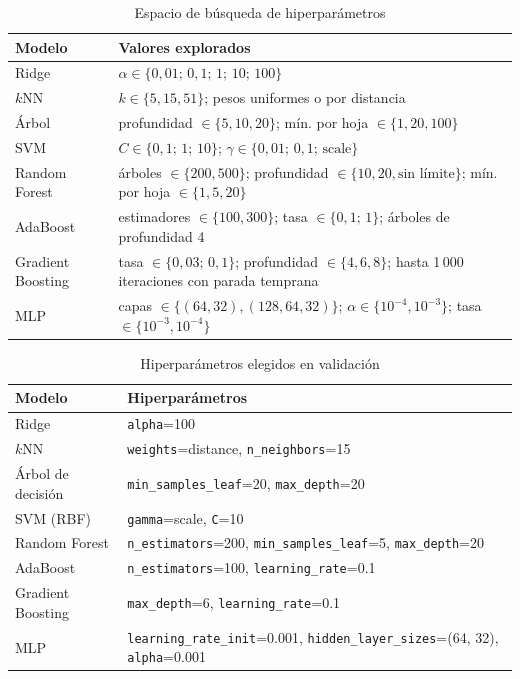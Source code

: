 \documentclass[conference,a4paper]{IEEEtran}
\begin{document}
\begin{table}[t]
\centering
\caption{Espacio de búsqueda de hiperparámetros}
\label{tab:hpgrid}
\footnotesize
\begin{tabular}{@{}L{1.7cm}L{6.1cm}@{}}
\toprule
Modelo & Valores explorados \\
\midrule
Ridge & $\alpha \in \{0{,}01;\,0{,}1;\,1;\,10;\,100\}$ \\
$k$NN & $k \in \{5, 15, 51\}$; pesos uniformes o por distancia \\
Árbol & profundidad $\in \{5, 10, 20\}$; mín. por hoja $\in \{1, 20, 100\}$ \\
SVM & $C \in \{0{,}1;\,1;\,10\}$; $\gamma \in \{0{,}01;\,0{,}1;\,\text{scale}\}$ \\
Random Forest & árboles $\in \{200, 500\}$; profundidad $\in \{10, 20, \text{sin límite}\}$; mín. por hoja $\in \{1, 5, 20\}$ \\
AdaBoost & estimadores $\in \{100, 300\}$; tasa $\in \{0{,}1;\,1\}$; árboles de profundidad 4 \\
Gradient Boosting & tasa $\in \{0{,}03;\,0{,}1\}$; profundidad $\in \{4, 6, 8\}$; hasta 1\,000 iteraciones con parada temprana \\
MLP & capas $\in \{(64,32), (128,64,32)\}$; $\alpha \in \{10^{-4}, 10^{-3}\}$; tasa $\in \{10^{-3}, 10^{-4}\}$ \\
\bottomrule
\end{tabular}
\end{table}

\begin{table}[t]
\centering
\caption{Hiperparámetros elegidos en validación}
\label{tab:hp}
\footnotesize
\begin{tabular}{@{}L{1.7cm}L{6.1cm}@{}}
\toprule
Modelo & Hiperparámetros \\
\midrule
Ridge & \texttt{alpha}=100 \\
$k$NN & \texttt{weights}=distance, \texttt{n\_neighbors}=15 \\
Árbol de decisión & \texttt{min\_samples\_leaf}=20, \texttt{max\_depth}=20 \\
SVM (RBF) & \texttt{gamma}=scale, \texttt{C}=10 \\
Random Forest & \texttt{n\_estimators}=200, \texttt{min\_samples\_leaf}=5, \texttt{max\_depth}=20 \\
AdaBoost & \texttt{n\_estimators}=100, \texttt{learning\_rate}=0.1 \\
Gradient Boosting & \texttt{max\_depth}=6, \texttt{learning\_rate}=0.1 \\
MLP & \texttt{learning\_rate\_init}=0.001, \texttt{hidden\_layer\_sizes}=(64, 32), \texttt{alpha}=0.001 \\
\bottomrule
\end{tabular}
\end{table}
\end{document}
